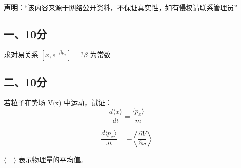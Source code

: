
\textbf{声明}：“该内容来源于网络公开资料，不保证真实性，如有侵权请联系管理员”

\subsection{一、10分}
求对易关系 $[x, e^{-\beta p_x}] = ? \beta$ 为常数
\subsection{二、10分}
若粒子在势场  V(x) 中运动，试证：
$$\frac{d \langle x \rangle}{dt} = \frac{\langle p_x \rangle}{m}~$$

$$\frac{d \langle p_x \rangle}{dt} = -\left\langle \frac{\partial V}{\partial x} \right\rangle~$$

$\langle \quad \rangle$ 表示物理量的平均值。